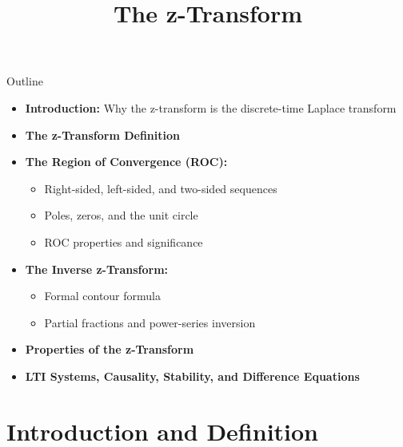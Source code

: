 

\title{The z-Transform}




\maketitle

\begin{frame}{Outline}
  \begin{itemize}
    \item \textbf{Introduction:} Why the z-transform is the discrete-time Laplace transform
    \item \textbf{The z-Transform Definition}
    \item \textbf{The Region of Convergence (ROC):}
      \begin{itemize}
        \item Right-sided, left-sided, and two-sided sequences
        \item Poles, zeros, and the unit circle
        \item ROC properties and significance
      \end{itemize}
    \item \textbf{The Inverse z-Transform:}
      \begin{itemize}
        \item Formal contour formula
        \item Partial fractions and power-series inversion
      \end{itemize}
    \item \textbf{Properties of the z-Transform}
    \item \textbf{LTI Systems, Causality, Stability, and Difference Equations}
  \end{itemize}
\end{frame}

\section{Introduction and Definition}

